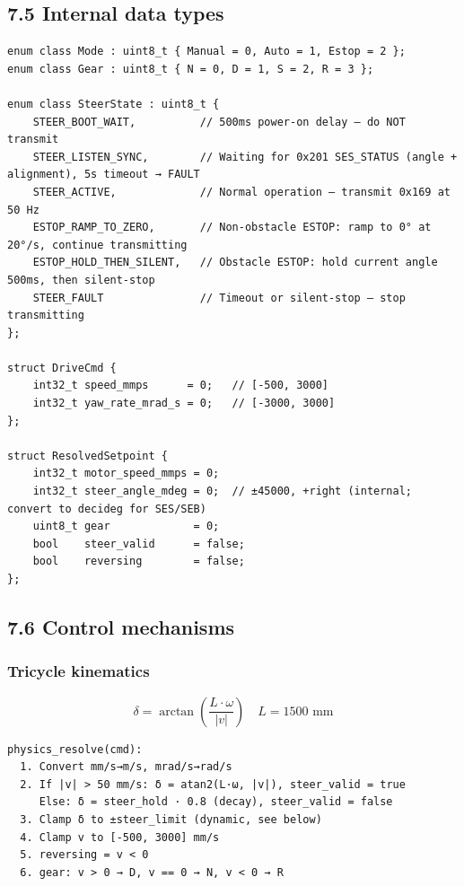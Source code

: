 \subsection{7.5 Internal data types}\label{internal-data-types}

\begin{verbatim}
enum class Mode : uint8_t { Manual = 0, Auto = 1, Estop = 2 };
enum class Gear : uint8_t { N = 0, D = 1, S = 2, R = 3 };

enum class SteerState : uint8_t {
    STEER_BOOT_WAIT,          // 500ms power-on delay — do NOT transmit
    STEER_LISTEN_SYNC,        // Waiting for 0x201 SES_STATUS (angle + alignment), 5s timeout → FAULT
    STEER_ACTIVE,             // Normal operation — transmit 0x169 at 50 Hz
    ESTOP_RAMP_TO_ZERO,       // Non-obstacle ESTOP: ramp to 0° at 20°/s, continue transmitting
    ESTOP_HOLD_THEN_SILENT,   // Obstacle ESTOP: hold current angle 500ms, then silent-stop
    STEER_FAULT               // Timeout or silent-stop — stop transmitting
};

struct DriveCmd {
    int32_t speed_mmps      = 0;   // [-500, 3000]
    int32_t yaw_rate_mrad_s = 0;   // [-3000, 3000]
};

struct ResolvedSetpoint {
    int32_t motor_speed_mmps = 0;
    int32_t steer_angle_mdeg = 0;  // ±45000, +right (internal; convert to decideg for SES/SEB)
    uint8_t gear             = 0;
    bool    steer_valid      = false;
    bool    reversing        = false;
};
\end{verbatim}

\subsection{7.6 Control mechanisms}\label{control-mechanisms}

\subsubsection{Tricycle kinematics}\label{tricycle-kinematics}

\[\delta = \arctan\left(\frac{L \cdot \omega}{|v|}\right) \quad L = 1500\text{ mm}\]

\begin{verbatim}
physics_resolve(cmd):
  1. Convert mm/s→m/s, mrad/s→rad/s
  2. If |v| > 50 mm/s: δ = atan2(L·ω, |v|), steer_valid = true
     Else: δ = steer_hold · 0.8 (decay), steer_valid = false
  3. Clamp δ to ±steer_limit (dynamic, see below)
  4. Clamp v to [-500, 3000] mm/s
  5. reversing = v < 0
  6. gear: v > 0 → D, v == 0 → N, v < 0 → R
\end{verbatim}

